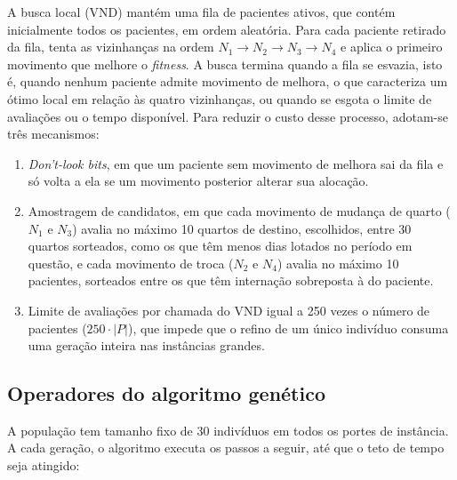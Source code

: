A busca local (VND) mantém uma fila de pacientes ativos, que contém inicialmente todos os pacientes, em ordem aleatória. Para cada paciente retirado da fila, tenta as vizinhanças na ordem $N_1 \rightarrow N_2 \rightarrow N_3 \rightarrow N_4$ e aplica o primeiro movimento que melhore o \textit{fitness}. A busca termina quando a fila se esvazia, isto é, quando nenhum paciente admite movimento de melhora, o que caracteriza um ótimo local em relação às quatro vizinhanças, ou quando se esgota o limite de avaliações ou o tempo disponível. Para reduzir o custo desse processo, adotam-se três mecanismos:

\begin{enumerate}
    \item \textit{Don't-look bits}, em que um paciente sem movimento de melhora sai da fila e só volta a ela se um movimento posterior alterar sua alocação.
    \item Amostragem de candidatos, em que cada movimento de mudança de quarto ($N_1$ e $N_3$) avalia no máximo 10 quartos de destino, escolhidos, entre 30 quartos sorteados, como os que têm menos dias lotados no período em questão, e cada movimento de troca ($N_2$ e $N_4$) avalia no máximo 10 pacientes, sorteados entre os que têm internação sobreposta à do paciente.
    \item Limite de avaliações por chamada do VND igual a 250 vezes o número de pacientes ($250 \cdot |P|$), que impede que o refino de um único indivíduo consuma uma geração inteira nas instâncias grandes.
\end{enumerate}


\subsection{Operadores do algoritmo genético}
\label{sec:operadores-ga}

A população tem tamanho fixo de 30 indivíduos em todos os portes de instância. A cada geração, o algoritmo executa os passos a seguir, até que o teto de tempo seja atingido:

